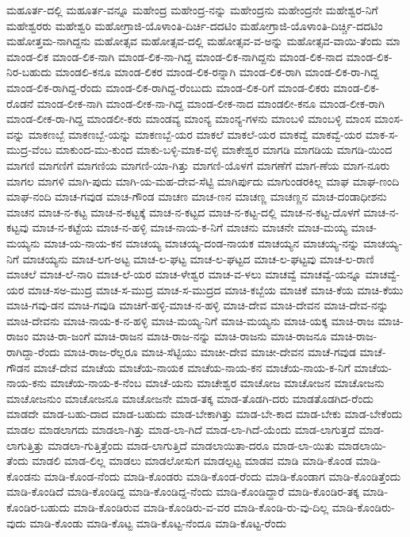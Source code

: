 ಮಹೂರ್ತ-ದಲ್ಲಿ
ಮಹೂರ್ತ-ವನ್ನೂ
ಮಹೇಂದ್ರ
ಮಹೇಂದ್ರ-ನನ್ನು
ಮಹೇಂದ್ರನು
ಮಹೇಂದ್ರನೇ
ಮಹೇಶ್ವರ-ನಿಗೆ
ಮಹೇಶ್ವರರು
ಮಹೇಶ್ವರಿ
ಮಹೋಗ್ರಾಜಿ-ಯೊಳಾಂತಿ-ದಿರ್ಚಿ-ದದಟಿಂ
ಮಹೋಗ್ರಾಜಿ-ಯೊಳಾಂತಿ-ದಿರ್ಚ್ಚಿ-ದದಟಿಂ
ಮಹೋತ್ತಮ-ನಾಗಿದ್ದನು
ಮಹೋತ್ಸವ
ಮಹೋತ್ಸವ-ದಲ್ಲಿ
ಮಹೋತ್ಸವ-ವ-ಅನ್ನು
ಮಹೋತ್ಸವ-ವಾಯಿ-ತೆಂದು
ಮಾ
ಮಾಂಡ-ಲಿಕ
ಮಾಂಡ-ಲಿಕ-ನಾಗಿ
ಮಾಂಡ-ಲಿಕ-ನಾ-ಗಿದ್ದ
ಮಾಂಡ-ಲಿಕ-ನಾಗಿದ್ದನು
ಮಾಂಡ-ಲಿಕ-ನಾದ
ಮಾಂಡ-ಲಿಕ-ನಿರ-ಬಹುದು
ಮಾಂಡಲಿ-ಕನೂ
ಮಾಂಡ-ಲಿಕರ
ಮಾಂಡ-ಲಿಕ-ರನ್ನಾಗಿ
ಮಾಂಡ-ಲಿಕ-ರಾಗಿ
ಮಾಂಡ-ಲಿಕ-ರಾ-ಗಿದ್ದ
ಮಾಂಡ-ಲಿಕ-ರಾಗಿದ್ದ-ರೆಂದು
ಮಾಂಡ-ಲಿಕ-ರಾಗಿದ್ದ-ರೆಂಬುದು
ಮಾಂಡ-ಲಿಕ-ರಿಗೆ
ಮಾಂಡ-ಲಿಕರು
ಮಾಂಡ-ಲಿಕ-ರೊಡನೆ
ಮಾಂಡ-ಲೀಕ-ನಾಗಿ
ಮಾಂಡ-ಲೀಕ-ನಾ-ಗಿದ್ದ
ಮಾಂಡ-ಲೀಕ-ನಾದ
ಮಾಂಡಲೀ-ಕನೂ
ಮಾಂಡ-ಲೀಕ-ರಾಗಿ
ಮಾಂಡ-ಲೀಕ-ರಾ-ಗಿದ್ದ
ಮಾಂಡಲೀ-ಕರು
ಮಾಂಡವ್ಯ
ಮಾಂನ್ಯ
ಮಾಂನ್ಯ-ಗಳನು
ಮಾಂಬಳಿ
ಮಾಂಬಳ್ಳಿ
ಮಾಂಸ
ಮಾಂಸ-ವನ್ನು
ಮಾಕಣಬ್ಬೆ
ಮಾಕಣಬ್ಬೆ-ಯನ್ನು
ಮಾಕಣಬ್ಬೆ-ಯರ
ಮಾಕಲೆ
ಮಾಕಲೆ-ಯರ
ಮಾಕವ್ವೆ
ಮಾಕವ್ವೆ-ಯರ
ಮಾಕ-ಸ-ಮುದ್ರ-ವೆಂಬ
ಮಾಕುಂದ-ಮು-ಕುಂದ
ಮಾಕು-ಬಳ್ಳಿ-ಮಾಕ-ವಳ್ಳಿ
ಮಾಕೇಶ್ವರ
ಮಾಗಡಿ
ಮಾಗಡಿಯ
ಮಾಗಡಿ-ಯಿಂದ
ಮಾಗಣಿ
ಮಾಗಣಿಗೆ
ಮಾಗಣಿಯ
ಮಾಗಣಿ-ಯಾ-ಗಿತ್ತು
ಮಾಗಣಿ-ಯೊಳಗೆ
ಮಾಗಣೆಗೆ
ಮಾಗ-ಣೆಯ
ಮಾಗ-ನೂರು
ಮಾಗಲ
ಮಾಗಳಿ
ಮಾಗಿ-ಪುದು
ಮಾಗಿ-ಯ-ಮಹ-ದೇವ-ಸೆಟ್ಟಿ
ಮಾಗಿರ್ಪುದು
ಮಾಗುಂಡರಕಿಲ್ಲ
ಮಾಘ
ಮಾಘ-ಣಂದಿ
ಮಾಘ-ನಂದಿ
ಮಾಚ-ಗವುಡ
ಮಾಚ-ಗೌಂಡ
ಮಾಚಣ
ಮಾಚ-ಣನ
ಮಾಚಣ್ಣ
ಮಾಚಣ್ಣನ
ಮಾಚ-ದಂಡಾಧೀಶನು
ಮಾಚನ
ಮಾಚ-ನ-ಕಟ್ಟ
ಮಾಚ-ನ-ಕಟ್ಟಕ್ಕೆ
ಮಾಚ-ನ-ಕಟ್ಟದ
ಮಾಚ-ನ-ಕಟ್ಟ-ದಲ್ಲಿ
ಮಾಚ-ನ-ಕಟ್ಟ-ದೊಳಗೆ
ಮಾಚ-ನ-ಕಟ್ಟವು
ಮಾಚ-ನ-ಕಟ್ಟೆಯ
ಮಾಚ-ನ-ಹಳ್ಳಿ
ಮಾಚ-ನಾಯ-ಕ-ನಿಗೆ
ಮಾಚನು
ಮಾಚನೇ
ಮಾಚ-ಮಯ್ಯ
ಮಾಚ-ಮಯ್ಯನು
ಮಾಚ-ಯ-ನಾಯ-ಕನ
ಮಾಚಯ್ಯ
ಮಾಚಯ್ಯ-ದಂಡ-ನಾಯಕ
ಮಾಚಯ್ಯನ
ಮಾಚಯ್ಯ-ನನ್ನು
ಮಾಚಯ್ಯ-ನಿಗೆ
ಮಾಚಯ್ಯನು
ಮಾಚ-ಲಗ-ಅಟ್ಟ
ಮಾಚ-ಲ-ಘಟ್ಟ
ಮಾಚ-ಲ-ಘಟ್ಟದ
ಮಾಚ-ಲ-ಘಟ್ಟವು
ಮಾಚ-ಲ-ರಾಣಿ
ಮಾಚಲೆ
ಮಾಚ-ಲೆ-ನಾರಿ
ಮಾಚ-ಲೆ-ಯರ
ಮಾಚ-ಳೇಶ್ವರ
ಮಾಚ-ವ-ಳಲು
ಮಾಚವ್ವೆ
ಮಾಚವ್ವೆ-ಯನ್ನೂ
ಮಾಚವ್ವೆ-ಯರ
ಮಾಚ-ಸಅ-ಮುದ್ರ
ಮಾಚ-ಸ-ಮುದ್ರ
ಮಾಚ-ಸ-ಮುದ್ರದ
ಮಾಚಿ-ಕಬ್ಬೆಯ
ಮಾಚಿಕೆ
ಮಾಚಿ-ಕೆಯ
ಮಾಚಿ-ಕೆಯು
ಮಾಚಿ-ಗವು-ಡನ
ಮಾಚಿ-ಗವುಡಿ
ಮಾಚಿಗೆ-ಹಳ್ಳಿ-ಮಾಚ-ನ-ಹಳ್ಳಿ
ಮಾಚಿ-ದೇವ
ಮಾಚಿ-ದೇವನ
ಮಾಚಿ-ದೇವ-ನನ್ನು
ಮಾಚಿ-ದೇವನು
ಮಾಚಿ-ನಾಯ-ಕ-ನ-ಹಳ್ಳಿ
ಮಾಚಿ-ಮಯ್ಯ-ನಿಗೆ
ಮಾಚಿ-ಮಯ್ಯನು
ಮಾಚಿ-ಯಕ್ಕ
ಮಾಚಿ-ರಾಜ
ಮಾಚಿ-ರಾಜಂ
ಮಾಚಿ-ರಾ-ಜಂಗೆ
ಮಾಚಿ-ರಾಜನ
ಮಾಚಿ-ರಾಜ-ನನ್ನು
ಮಾಚಿ-ರಾಜನು
ಮಾಚಿ-ರಾಜನೂ
ಮಾಚಿ-ರಾಜ-ರಾಗಿದ್ದಾ-ರೆಂದು
ಮಾಚಿ-ರಾಜ-ರೆಲ್ಲರೂ
ಮಾಚಿ-ಸೆಟ್ಟಿಯು
ಮಾಚೀ-ದೇವ
ಮಾಚೀ-ದೇವನ
ಮಾಚೆ-ಗವುಡ
ಮಾಚೆ-ಗೌಡನ
ಮಾಚೆ-ದೇವ
ಮಾಚೆಯ
ಮಾಚೆಯ-ನಾಯಕ
ಮಾಚೆಯ-ನಾಯ-ಕನ
ಮಾಚೆಯ-ನಾಯ-ಕ-ನಿಗೆ
ಮಾಚೆಯ-ನಾಯ-ಕನು
ಮಾಚೆಯ-ನಾಯ-ಕ-ನೆಂಬ
ಮಾಚೆ-ಯನು
ಮಾಚೇಶ್ವರ
ಮಾಚೋಜ
ಮಾಚೋಜನ
ಮಾಚೋಜನು
ಮಾಚೋಜನುಂ
ಮಾಚೋಜನೂ
ಮಾಚೋಜನೇ
ಮಾಡ-ತಕ್ಕ
ಮಾಡ-ತೊಡಗಿ-ದರು
ಮಾಡತೊಡಗಿದ-ರೆಂದು
ಮಾಡದೇ
ಮಾಡ-ಬಹು-ದಾದ
ಮಾಡ-ಬಹುದು
ಮಾಡ-ಬೇಕಾಗಿತ್ತು
ಮಾಡ-ಬೇ-ಕಾದ
ಮಾಡ-ಬೇಕು
ಮಾಡ-ಬೇಕೆಂದು
ಮಾಡಲ
ಮಾಡಲಾಗದು
ಮಾಡಲಾ-ಗಿತ್ತು
ಮಾಡ-ಲಾ-ಗಿದೆ
ಮಾಡ-ಲಾ-ಗಿದೆ-ಯೆಂದು
ಮಾಡ-ಲಾಗುತ್ತದೆ
ಮಾಡ-ಲಾಗುತ್ತಿತ್ತು
ಮಾಡಲಾ-ಗುತ್ತಿತ್ತೆಂದು
ಮಾಡ-ಲಾಗುತ್ತಿದೆ
ಮಾಡಲಾಯಿತಾ-ದರೂ
ಮಾಡ-ಲಾ-ಯಿತು
ಮಾಡಲಾಯಿ-ತೆಂದು
ಮಾಡಲಿ
ಮಾಡ-ಲಿಲ್ಲ
ಮಾಡಲು
ಮಾಡಲೋಸುಗ
ಮಾಡಲ್ಪಟ್ಟ
ಮಾಡವ
ಮಾಡಿ
ಮಾಡಿ-ಕೊಂಡ
ಮಾಡಿ-ಕೊಂಡನು
ಮಾಡಿ-ಕೊಂಡ-ನೆಂದು
ಮಾಡಿ-ಕೊಂಡರು
ಮಾಡಿ-ಕೊಂಡ-ರೆಂದು
ಮಾಡಿ-ಕೊಂಡಾಗ
ಮಾಡಿ-ಕೊಂಡಿತ್ತೆಂದು
ಮಾಡಿ-ಕೊಂಡಿದೆ
ಮಾಡಿ-ಕೊಂಡಿದ್ದ
ಮಾಡಿ-ಕೊಂಡಿದ್ದ-ನೆಂದು
ಮಾಡಿ-ಕೊಂಡಿದ್ದಾರೆ
ಮಾಡಿ-ಕೊಂಡಿರ-ತಕ್ಕ
ಮಾಡಿ-ಕೊಂಡಿರ-ಬಹುದು
ಮಾಡಿ-ಕೊಂಡಿರುವ
ಮಾಡಿ-ಕೊಂಡಿರು-ವ-ವರ
ಮಾಡಿ-ಕೊಂಡಿ-ರು-ವು-ದಿಲ್ಲ
ಮಾಡಿ-ಕೊಂಡಿರು-ವುದು
ಮಾಡಿ-ಕೊಂಡು
ಮಾಡಿ-ಕೊಟ್ಟ
ಮಾಡಿ-ಕೊಟ್ಟ-ನೆಂದೂ
ಮಾಡಿ-ಕೊಟ್ಟ-ರೆಂದು
